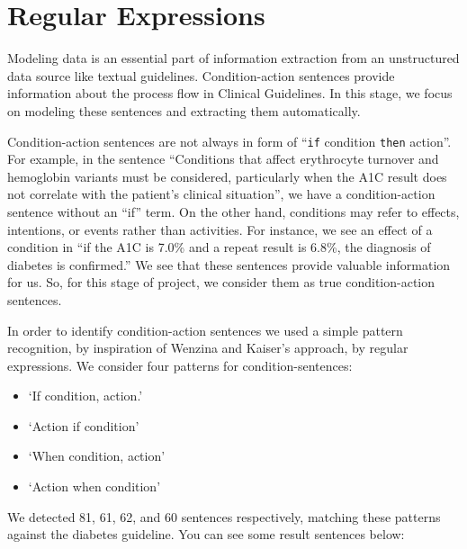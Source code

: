 \documentclass[12pt,letterpaper]{article}
\begin{document}
\section{Regular Expressions}
Modeling data is an essential part of information extraction from an unstructured data source like textual guidelines. Condition-action sentences provide information about the process flow in Clinical Guidelines. In this stage, we focus on modeling these sentences and extracting them automatically.

Condition-action sentences are not always in form of ``\texttt{if} condition \texttt{then} action''. For example, in the sentence ``Conditions that affect erythrocyte turnover and hemoglobin variants must be considered, particularly when the A1C result does not correlate with the patient's clinical situation'', we have a condition-action sentence without an ``if'' term. On the other hand, conditions may refer to effects, intentions, or events rather than activities. For instance, we see an effect of a condition in ``if the A1C is 7.0\% and a repeat result is 6.8\%, the diagnosis of diabetes is confirmed.'' We see that these sentences provide valuable information for us. So, for this stage of project, we consider them as true condition-action sentences. 

In order to identify condition-action sentences we used a simple pattern recognition, by inspiration of Wenzina and Kaiser's approach\cite{wenzina2013identifying},  by regular expressions. We consider four patterns for condition-sentences: 
\begin{itemize}
	\item `If condition, action.'
	\item `Action if condition'
	\item `When condition, action'
	\item `Action when condition'
\end{itemize}
We detected 81, 61, 62, and 60 sentences respectively, matching these patterns against the diabetes guideline. You can see some result sentences below:
\end{document}
